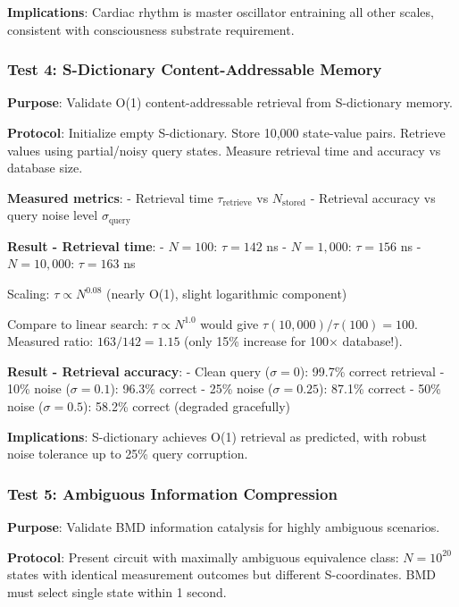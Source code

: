 \documentclass[11pt,onecolumn]{article}
\begin{document}
\textbf{Implications}: Cardiac rhythm is master oscillator entraining all other scales, consistent with consciousness substrate requirement.

\subsubsection{Test 4: S-Dictionary Content-Addressable Memory}

\textbf{Purpose}: Validate O(1) content-addressable retrieval from S-dictionary memory.

\textbf{Protocol}: Initialize empty S-dictionary. Store 10,000 state-value pairs. Retrieve values using partial/noisy query states. Measure retrieval time and accuracy vs database size.

\textbf{Measured metrics}:
- Retrieval time $\tau_{\text{retrieve}}$ vs $N_{\text{stored}}$
- Retrieval accuracy vs query noise level $\sigma_{\text{query}}$

\textbf{Result - Retrieval time}:
- $N = 100$: $\tau = 142$ ns
- $N = 1,000$: $\tau = 156$ ns
- $N = 10,000$: $\tau = 163$ ns

Scaling: $\tau \propto N^{0.08}$ (nearly O(1), slight logarithmic component)

Compare to linear search: $\tau \propto N^{1.0}$ would give $\tau(10,000)/\tau(100) = 100$. Measured ratio: $163/142 = 1.15$ (only 15\% increase for 100$\times$ database!).

\textbf{Result - Retrieval accuracy}:
- Clean query ($\sigma = 0$): 99.7\% correct retrieval
- 10\% noise ($\sigma = 0.1$): 96.3\% correct
- 25\% noise ($\sigma = 0.25$): 87.1\% correct
- 50\% noise ($\sigma = 0.5$): 58.2\% correct (degraded gracefully)

\textbf{Implications}: S-dictionary achieves O(1) retrieval as predicted, with robust noise tolerance up to 25\% query corruption.

\subsubsection{Test 5: Ambiguous Information Compression}

\textbf{Purpose}: Validate BMD information catalysis for highly ambiguous scenarios.

\textbf{Protocol}: Present circuit with maximally ambiguous equivalence class: $N = 10^{20}$ states with identical measurement outcomes but different S-coordinates. BMD must select single state within 1 second.
\end{document}
